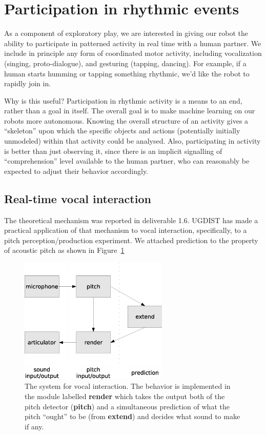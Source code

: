 
\section{Participation in rhythmic events}

As a component of exploratory play, we are interested in giving our
robot the ability to participate in patterned activity in real time
with a human partner.  We include in principle any form of
coordinated motor activity, including vocalization
(singing, proto-dialogue), and gesturing (tapping, dancing).
%
For example, if a human starts humming or tapping something rhythmic, 
we'd like the robot to rapidly join in.

Why is this useful?  Participation in rhythmic activity is a means to
an end, rather than a goal in itself.  The overall goal is to make
machine learning on our robots more autonomous.
%
Knowing the overall structure of an activity gives a ``skeleton'' upon
which the specific objects and actions (potentially initially
unmodeled) within that activity could be analysed.
%
Also, participating in activity is better than just observing it,
since there is an implicit signalling of ``comprehension'' level
available to the human partner, who can reasonably be expected to
adjust their behavior accordingly.


\subsection{Real-time vocal interaction}

The theoretical mechanism was reported in deliverable 1.6.  
UGDIST has made a practical application of that mechanism to
vocal interaction, specifically, to a pitch perception/production
experiment.  We attached prediction to the property of acoustic pitch
as shown in Figure~\ref{fig:sing-module}


\begin{figure}[hbt]
\centerline{\includegraphics[height=6cm]{images/sing-modules}}
\caption {
%
\label{fig:sing-module}
%
The system for vocal interaction.
The behavior is implemented in the module labelled {\bf render} which
takes the output both of the pitch detector ({\bf pitch}) and a simultaneous 
prediction of what the pitch ``ought'' to be (from {\bf extend})
and decides what sound to make if any.
%
}
\end{figure}

